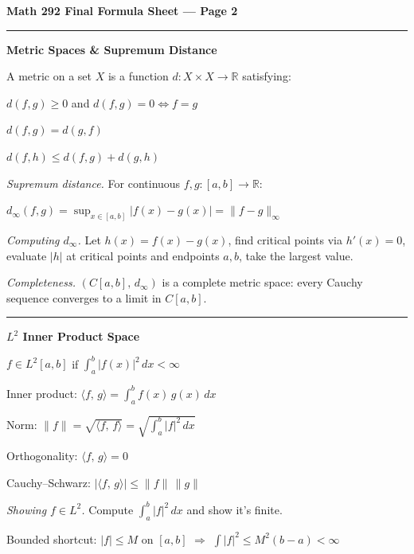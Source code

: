 \documentclass[10pt]{article}
\renewcommand{\large}{\fontsize{11pt}{14pt}\selectfont}
\newcommand{\R}{\mathbb{R}}
\newcommand{\norm}[1]{\|#1\|}
\newcommand{\inner}[2]{\langle #1,\,#2 \rangle}
\newcommand{\heading}[1]{\bigskip\hrule\vspace{5pt}\textbf{#1}\vspace{8pt}\par}
\newcommand{\sub}[1]{\bigskip\textit{#1.}\;}
\newlength{\colw}
\begin{document}
\newpage


\begin{center}
  {\large\textbf{Math 292 Final Formula Sheet --- Page 2}}
\end{center}

\noindent
\begin{minipage}[t]{\colw}

  \heading{Metric Spaces \& Supremum Distance}

  A metric on a set $X$ is a function $d:X\times X\to\R$ satisfying:

  $d(f,g)\ge 0$ and $d(f,g)=0\Leftrightarrow f=g$

  $d(f,g)=d(g,f)$

  $d(f,h)\le d(f,g)+d(g,h)$

  \sub{Supremum distance} For continuous $f,g:[a,b]\to\R$:

  $d_\infty(f,g)=\sup_{x\in[a,b]}|f(x)-g(x)|=\norm{f-g}_\infty$

  \sub{Computing $d_\infty$} Let $h(x)=f(x)-g(x)$, find critical points via $h'(x)=0$, evaluate $|h|$ at critical points and endpoints $a,b$, take the largest value.

  \sub{Completeness} $(C[a,b],\,d_\infty)$ is a complete metric space: every Cauchy sequence converges to a limit in $C[a,b]$.

  \heading{$L^2$ Inner Product Space}

  $f\in L^2[a,b]$ if $\displaystyle\int_a^b|f(x)|^2\,dx<\infty$

  Inner product: $\inner{f}{g}=\displaystyle\int_a^b f(x)\,g(x)\,dx$

  Norm: $\norm{f}=\sqrt{\inner{f}{f}} = \sqrt{\displaystyle\int_a^b|f|^2\,dx}$

  Orthogonality: $\inner{f}{g}=0$

  Cauchy--Schwarz: $|\inner{f}{g}|\le\norm{f}\,\norm{g}$

  \sub{Showing $f\in L^2$} Compute $\int_a^b|f|^2\,dx$ and show it's finite.

  Bounded shortcut: $|f|\le M$ on $[a,b]$ $\Rightarrow$ $\int|f|^2\le M^2(b-a)<\infty$

\end{minipage}\hfill\vrule\hfill
\end{document}
